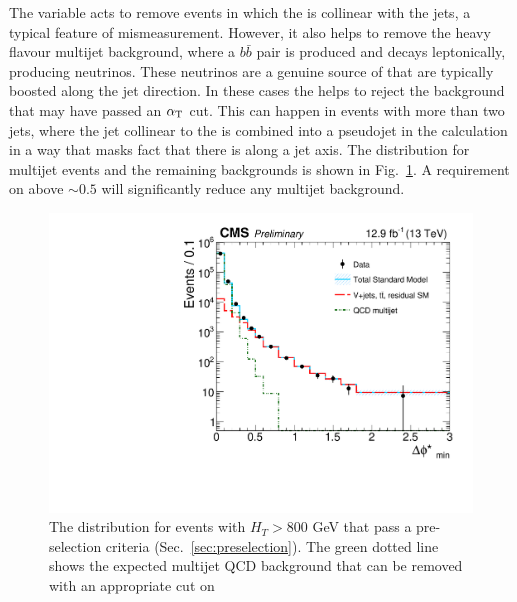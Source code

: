 The \bdphi variable acts to remove events in which the \MET is
collinear with the jets, a typical feature of mismeasurement. However,
it also helps to remove the heavy flavour \QCD multijet background,
where a $b\bar{b}$ pair is produced and decays leptonically, producing
neutrinos. These neutrinos are a genuine source of \MET that are
typically boosted along the jet direction. In these cases the \bdphi
helps to reject the \QCD background that may have passed an $\alpha_{\text{T}}$
cut. This can happen in events with more than two jets, where the
jet collinear to the \MET is combined into a pseudojet in the \alphat
calculation in a way that masks fact that there is \MET along a jet
axis. The
\bdphi distribution for multijet events and the remaining \SM
backgrounds is shown in Fig.~\ref{fig:bdphi}. A requirement on \bdphi
above $\sim 0.5$ will significantly reduce any \QCD multijet
background.

\begin{figure}
	\begin{center}
		\includegraphics[width=0.7\linewidth]{figs/analysis/eventSelection/CMS-PAS-SUS-16-016_Figure-aux_002}%
	\end{center}
  \caption{The \bdphi distribution for events with $H_T>800$ GeV that
  pass a pre-selection criteria (Sec.~\ref{sec:preselection}). The
  green dotted line shows the expected multijet QCD background that
  can be removed with an appropriate cut on \bdphi}
	\label{fig:bdphi}
\end{figure}


